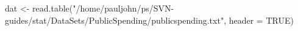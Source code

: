 \begin{Schunk}
\begin{Sinput}
 dat <- read.table("/home/pauljohn/ps/SVN-guides/stat/DataSets/PublicSpending/publicspending.txt", header = TRUE)
\end{Sinput}
\end{Schunk}
